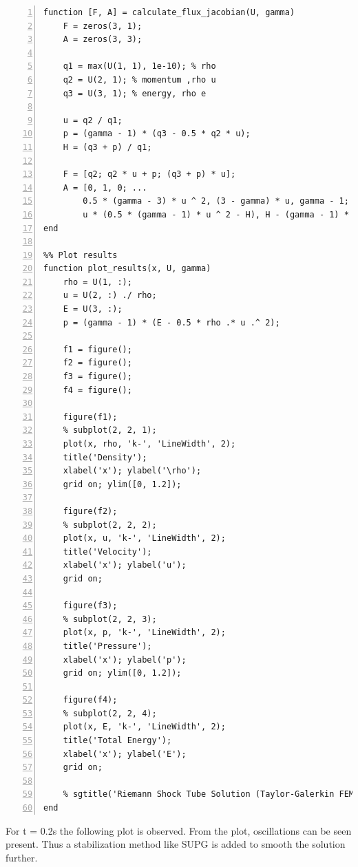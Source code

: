 \documentclass[12pt, oneside]{article}
\begin{document}
\begin{lstlisting}[frame=single, numbers=left, style=Matlab-editor]
function [F, A] = calculate_flux_jacobian(U, gamma)
    F = zeros(3, 1);
    A = zeros(3, 3);

    q1 = max(U(1, 1), 1e-10); % rho
    q2 = U(2, 1); % momentum ,rho u
    q3 = U(3, 1); % energy, rho e

    u = q2 / q1;
    p = (gamma - 1) * (q3 - 0.5 * q2 * u);
    H = (q3 + p) / q1;

    F = [q2; q2 * u + p; (q3 + p) * u];
    A = [0, 1, 0; ...
	    0.5 * (gamma - 3) * u ^ 2, (3 - gamma) * u, gamma - 1; ...
	    u * (0.5 * (gamma - 1) * u ^ 2 - H), H - (gamma - 1) * u ^ 2, gamma * u];
end

%% Plot results
function plot_results(x, U, gamma)
    rho = U(1, :);
    u = U(2, :) ./ rho;
    E = U(3, :);
    p = (gamma - 1) * (E - 0.5 * rho .* u .^ 2);

    f1 = figure();
    f2 = figure();
    f3 = figure();
    f4 = figure();

    figure(f1);
    % subplot(2, 2, 1);
    plot(x, rho, 'k-', 'LineWidth', 2);
    title('Density');
    xlabel('x'); ylabel('\rho');
    grid on; ylim([0, 1.2]);

    figure(f2);
    % subplot(2, 2, 2);
    plot(x, u, 'k-', 'LineWidth', 2);
    title('Velocity');
    xlabel('x'); ylabel('u');
    grid on;

    figure(f3);
    % subplot(2, 2, 3);
    plot(x, p, 'k-', 'LineWidth', 2);
    title('Pressure');
    xlabel('x'); ylabel('p');
    grid on; ylim([0, 1.2]);

    figure(f4);
    % subplot(2, 2, 4);
    plot(x, E, 'k-', 'LineWidth', 2);
    title('Total Energy');
    xlabel('x'); ylabel('E');
    grid on;

    % sgtitle('Riemann Shock Tube Solution (Taylor-Galerkin FEM)');
end
\end{lstlisting}
For t = 0.2s the following plot is observed. From the plot, oscillations can be seen present. Thus a stabilization method like SUPG is added to smooth the solution further.
\end{document}
